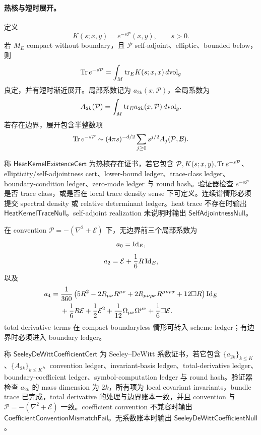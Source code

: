 \paragraph{热核与短时展开。}
定义
\[
K(s;x,y)=e^{-s\mathcal P}(x,y),\qquad s>0.
\]
若 \(M_E\) compact without boundary，且 \(\mathcal P\) self-adjoint、elliptic、bounded below，则
\[
{\rm Tr}\,e^{-s\mathcal P}
=
\int_M{\rm tr}_E K(s;x,x)\,d{\rm vol}_g
\]
良定，并有短时渐近展开。局部系数记为 \(a_{2k}(x,\mathcal P)\)，全局系数为
\[
A_{2k}(\mathcal P)
=
\int_M{\rm tr}_E a_{2k}(x,\mathcal P)\,d{\rm vol}_g.
\]
若存在边界，展开包含半整数项
\[
{\rm Tr}\,e^{-s\mathcal P}
\sim
(4\pi s)^{-d/2}
\sum_{j\ge0}s^{j/2}A_j(\mathcal P,\mathcal B).
\]

\begin{definition}[热核存在证书]\label{def:typed-address-biaxial-completion-heat-kernel-existence-cert}
称 \(\mathsf{HeatKernelExistenceCert}\) 为热核存在证书，若它包含 \(\mathcal P,K(s;x,y),{\rm Tr}\,e^{-s\mathcal P}\)、ellipticity/self-adjointness cert、lower-bound ledger、trace-class ledger、boundary-condition ledger、zero-mode ledger 与 round hash。验证器检查 \(e^{-s\mathcal P}\) 是否 trace class，或是否在 local trace density sense 下可定义。连续谱情形必须提交 spectral density 或 relative determinant ledger。heat trace 不存在时输出 \(\mathsf{HeatKernelTraceNull}\)。self-adjoint realization 未说明时输出 \(\mathsf{SelfAdjointnessNull}\)。
\end{definition}

在 convention \(\mathcal P=-(\nabla^2+\mathcal E)\) 下，无边界前三个局部系数为
\[
a_0={\rm Id}_E,
\]
\[
a_2=\mathcal E+\frac16R\,{\rm Id}_E,
\]
以及
\[
\begin{aligned}
a_4={}&
\frac1{360}
\left(
5R^2
-2R_{\mu\nu}R^{\mu\nu}
+2R_{\mu\nu\rho\sigma}R^{\mu\nu\rho\sigma}
+12\Box R
\right){\rm Id}_E\\
&+
\frac16R\mathcal E
+\frac12\mathcal E^2
+\frac1{12}\Omega_{\mu\nu}\Omega^{\mu\nu}
+\frac16\Box\mathcal E.
\end{aligned}
\]
total derivative terms 在 compact boundaryless 情形可转入 scheme ledger；有边界时必须进入 boundary ledger。

\begin{definition}\label{def:typed-address-biaxial-completion-seeley-dewitt-coefficient-cert}
称 \(\mathsf{SeeleyDeWittCoefficientCert}\) 为 Seeley--DeWitt 系数证书，若它包含 \(\{a_{2k}\}_{k\le K}\)、\(\{A_{2k}\}_{k\le K}\)、convention ledger、invariant-basis ledger、total-derivative ledger、boundary-coefficient ledger、symbol-computation ledger 与 round hash。验证器检查 \(a_{2k}\) 的 mass dimension 为 \(2k\)，所有项为 local covariant invariants，bundle trace 已完成，total derivative 的处理与边界账本一致，并且 convention 与 \(\mathcal P=-(\nabla^2+\mathcal E)\) 一致。coefficient convention 不兼容时输出 \(\mathsf{CoefficientConventionMismatchFail}\)。无系数账本时输出 \(\mathsf{SeeleyDeWittCoefficientNull}\)。
\end{definition}

